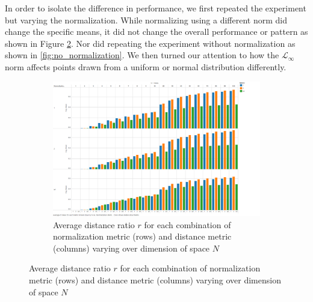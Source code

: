 \documentclass{article}
\begin{document}
In order to isolate the difference in performance, we first repeated the experiment but varying the normalization. While normalizing using a different norm did change the specific means, it did not change the overall performance or pattern as shown in Figure \ref{fig:normmetrics}. Nor did repeating the experiment without normalization as shown in \ref{fig:no_normalization}. We then turned our attention to how the $\mathcal{L}_{\infty}$ norm affects points drawn from a uniform or normal distribution differently.
\
\begin{figure}[H]
\centering
\begin{subfigure}[h]{0.75\textwidth}
        \includegraphics[width=1\textwidth]{normalization_metrics.png}
        \caption{Average distance ratio $r$ for each combination of normalization metric (rows) and distance metric (columns) varying over dimension of space $N$}
        \label{fig:normmetrics}
\end{subfigure}


\end{figure}
\end{document}
